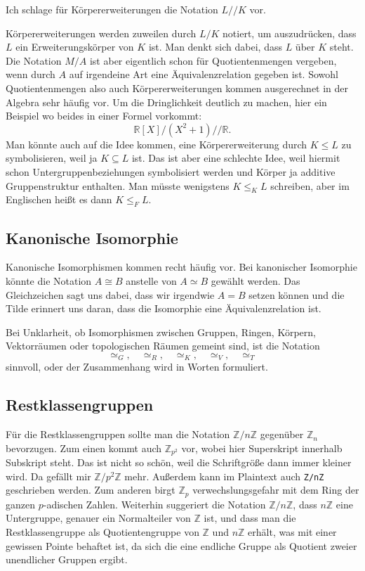 \documentclass[a4paper,11pt,fleqn,twoside,BCOR=16mm]{scrartcl}
\newcommand{\Z}{\mathbb Z}
\begin{document}
Ich schlage für Körpererweiterungen die Notation $L/\!/K$
vor.

Körpererweiterungen werden zuweilen durch $L/K$ notiert, um
auszudrücken, dass $L$ ein Erweiterungskörper von $K$ ist.
Man denkt sich dabei, dass $L$ über $K$ steht. Die Notation
$M/A$ ist aber eigentlich schon für Quotientenmengen vergeben,
wenn durch $A$ auf irgendeine Art eine Äquivalenzrelation
gegeben ist. Sowohl Quotientenmengen also auch Körpererweiterungen
kommen ausgerechnet in der Algebra sehr häufig vor.
Um die Dringlichkeit deutlich zu machen, hier ein Beispiel
wo beides in einer Formel vorkommt:
\begin{equation}
\mathbb R[X]/(X^2+1)/\!/\mathbb R.
\end{equation}
Man könnte auch auf die Idee kommen, eine Körpererweiterung
durch $K\le L$ zu symbolisieren, weil ja $K\subseteq L$ ist.
Das ist aber eine schlechte Idee, weil hiermit schon
Untergruppenbeziehungen symbolisiert werden und Körper ja
additive Gruppenstruktur enthalten. Man müsste wenigstens
$K\le_K L$ schreiben, aber im Englischen heißt es dann $K\le_F L$.

\subsection{Kanonische Isomorphie}
Kanonische Isomorphismen kommen recht häufig vor.
Bei kanonischer Isomorphie könnte die Notation $A\cong B$
anstelle von $A\simeq B$ gewählt werden. Das Gleichzeichen sagt
uns dabei, dass wir irgendwie $A=B$ setzen können und die Tilde
erinnert uns daran, dass die Isomorphie eine Äquivalenzrelation
ist.

Bei Unklarheit, ob Isomorphismen zwischen Gruppen, Ringen, Körpern,
Vektorräumen oder topologischen Räumen gemeint sind, ist die
Notation
\begin{equation}
\simeq_G,\quad\simeq_R,\quad\simeq_K,\quad\simeq_V,\quad\simeq_T
\end{equation}
sinnvoll, oder der Zusammenhang wird in Worten formuliert.

\subsection{Restklassengruppen}
Für die Restklassengruppen sollte man die Notation $\Z/n\Z$
gegenüber $\Z_n$ bevorzugen. Zum einen kommt auch $\Z_{p^2}$
vor, wobei hier Superskript innerhalb Subskript steht.
Das ist nicht so schön, weil die Schriftgröße dann immer kleiner
wird. Da gefällt mir $\Z/p^2\Z$ mehr. Außerdem kann im Plaintext
auch \verb|Z/nZ| geschrieben werden. Zum anderen birgt $\Z_p$
verwechslungsgefahr mit dem Ring der ganzen $p$-adischen Zahlen.
Weiterhin suggeriert die
Notation $\Z/n\Z$, dass $n\Z$ eine Untergruppe, genauer ein
Normalteiler von $\Z$ ist, und dass man die Restklassengruppe
als Quotientengruppe von $\Z$ und $n\Z$ erhält, was mit einer
gewissen Pointe behaftet ist, da sich die eine endliche Gruppe
als Quotient zweier unendlicher Gruppen ergibt.
\end{document}
